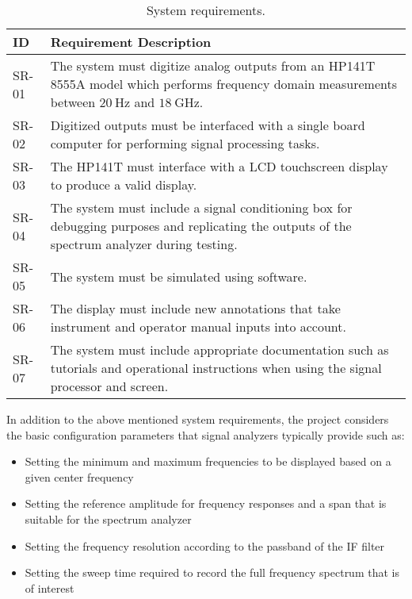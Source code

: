 \documentclass[class=report,11pt,crop=false]{standalone}
\begin{document}
\begin{table}[!ht]
	\centering
	\caption{System requirements.}
	\begin{tabular}{|m{5em}|m{40em}|}
		\hline
		\textbf{ID} & \textbf{Requirement Description}\\
		\hline
		SR-01 	& The system must digitize analog outputs from an HP141T 8555A model which performs frequency domain measurements between $\SI{20}{\hertz}$ and $\SI{18}{\giga\hertz}$.\\
		\hline
		SR-02	& Digitized outputs must be interfaced with a single board computer for performing signal processing tasks.\\
		\hline
		SR-03	& The HP141T must interface with a LCD touchscreen display to produce a valid display.\\
		\hline
		SR-04	& The system must include a signal conditioning box for debugging purposes and replicating the outputs of the spectrum analyzer during testing.\\
		\hline
		SR-05   & The system must be simulated using software.\\
		\hline
		SR-06	& The display must include new annotations that take instrument and operator manual inputs into account. \\
		\hline
		SR-07	& The system must include appropriate documentation such as tutorials and operational instructions when using the signal processor and screen.\\
		\hline
	\end{tabular}
\label{tab:sys-requirements}
\end{table}

In addition to the above mentioned system requirements, the project considers the basic configuration parameters that signal analyzers typically provide such as:
\begin{itemize}
	\item 
	Setting the minimum and maximum frequencies to be displayed based on a given center frequency 
	\item 
	Setting the reference amplitude for frequency responses and a span that is suitable for the spectrum analyzer
	\item 
	Setting the frequency resolution according to the passband of the IF filter
	\item 
	Setting the sweep time required to record the full frequency spectrum that is of interest
\end{itemize}
\end{document}
